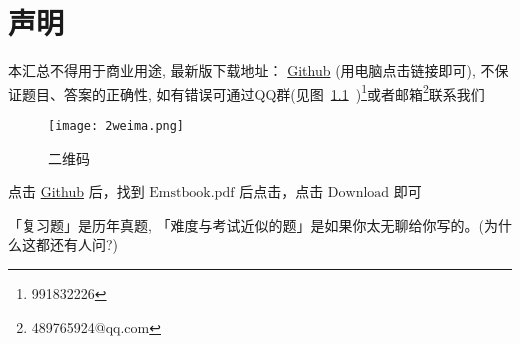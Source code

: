 \chapter{声明}
本汇总不得用于商业用途, 最新版下载地址： \href{https://github.com/sikouhjw/Mathematical-rearrangement}{Github} (用电脑点击链接即可), 不保证题目、答案的正确性, 如有错误可通过QQ群(见图~\ref{fig:1}~)\footnote{991832226}或者邮箱\footnote{489765924@qq.com}联系我们
\begin{figure}[htbp]
	\centering
	\texttt{[image: 2weima.png]}
	\caption{二维码}\label{fig:1}
\end{figure}

点击 \href{https://github.com/sikouhjw/Engineering-mathematics-sunflower-treasure-book}{Github} 后，找到 $\mathrm{Emstbook.pdf}$ 后点击，点击 $\mathrm{Download}$ 即可

「复习题」是历年真题, 「难度与考试近似的题」是如果你太无聊给你写的。(为什么这都还有人问?)

